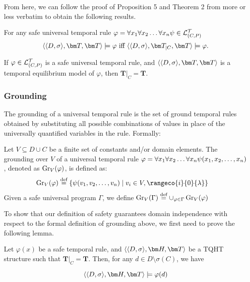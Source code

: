 From here, we can follow the proof of Proposition 5 and Theorem 2 from \cite{agcapevidi17a} more
or less verbatim to obtain the following results.

\begin{proposition}
  For any safe universal temporal rule $\varphi = \forall x_1 \forall x_2 \dots \forall x_n \psi \in \mathcal{L}_{(C,P)}^\mathcal{T}$
  \begin{equation*} \qttandt \models \varphi \text{ iff } \qttcandt \models \varphi. \end{equation*}
\end{proposition}

\begin{theorem}
  If $\varphi \in \mathcal{L}_{(C,P)}^\mathcal{T}$ is a safe universal temporal rule, and
  $\qttandt$ is a temporal equilibrium model of $\varphi$, then
  $\bm{T}\vert_{C}=\bm{T}$.
\end{theorem}

\subsubsection{Grounding}

The grounding of a universal temporal rule is the set of ground
temporal rules obtained by substituting all possible combinations of
values in place of the universally quantified variables in the
rule. Formally:

\begin{definition}[Grounding]
  Let $V \subseteq D \cup C$ be a finite set of constants and/or
  domain elements. The grounding over $V$ of a universal temporal rule
  $\varphi = \forall x_1 \forall x_2 \dots \forall x_n \psi(x_1,x_2,\dots,x_n)$, denoted as
  $\operatorname{Gr}_{V}(\varphi)$, is defined as:
  \begin{align*}
    \ground{V}{\varphi} \defeq \{ &\psi(v_1,v_2,\dots,v_n) \mid v_i \in V, \rangeco{i}{0}{\lambda}\}
  \end{align*}
  Given a safe universal program $\Gamma$, we define
  $\operatorname{Gr}_{V}(\Gamma) \stackrel{\text{def}}{=} \cup_{\varphi \in
    \Gamma}\operatorname{Gr}_{V}(\varphi)$
\end{definition}

To show that our definition of safety guarantees domain independence
with respect to the formal definition of grounding above, we first
need to prove the following lemma.

\begin{lemma}\label{lemma:not-imsigma-domain-sat}
  Let $\varphi(x)$ be a safe temporal rule, and $\qthandt$ be a
  TQHT structure such that $\bm{T}\vert_{C}=\bm{T}$. Then, for any
  $d \in D \setminus \sigma(C)$, we have

  \begin{equation*}
    \qthandt \models \varphi(d)
  \end{equation*}
  
\end{lemma}

